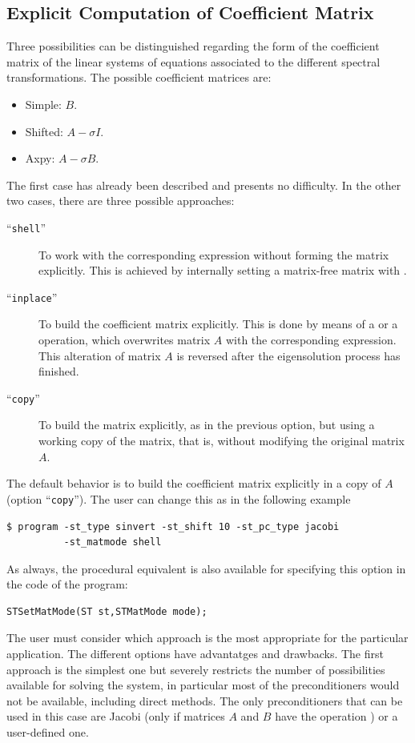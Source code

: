 \subsection{Explicit Computation of Coefficient Matrix}
\label{sec:explicit}

	Three possibilities can be distinguished regarding the form of the coefficient matrix of the linear systems of equations associated to the different spectral transformations. The possible coefficient matrices are:
	\begin{itemize}
	\item Simple: $B$.
	\item Shifted: $A-\sigma I$.
	\item Axpy: $A-\sigma B$.
	\end{itemize}
	The first case has already been described and presents no difficulty. In the other two cases, there are three possible approaches:
	\begin{description}
	\item[``\Verb!shell!''] To work with the corresponding expression without forming the matrix explicitly. This is achieved by internally setting a matrix-free matrix with .
	\item[``\Verb!inplace!''] To build the coefficient matrix explicitly. This is done by means of a  or a  operation, which overwrites matrix $A$ with the corresponding expression. This alteration of matrix $A$ is reversed after the eigensolution process has finished.
	\item[``\Verb!copy!''] To build the matrix explicitly, as in the previous option, but using a working copy of the matrix, that is, without modifying the original matrix $A$. 
	\end{description}
	The default behavior is to build the coefficient matrix explicitly in a copy of $A$ (option ``\Verb!copy!''). The user can change this as in the following example
\begin{Verbatim}[fontsize=\small]
	$ program -st_type sinvert -st_shift 10 -st_pc_type jacobi
		  -st_matmode shell
\end{Verbatim}
	As always, the procedural equivalent is also available for specifying this option in the code of the program:
	\begin{Verbatim}[fontsize=\small]
	STSetMatMode(ST st,STMatMode mode);
	\end{Verbatim}

	The user must consider which approach is the most appropriate for the particular application. The different options have advantatges and drawbacks. The first approach is the simplest one but severely restricts the number of possibilities available for solving the system, in particular most of the \petsc{} preconditioners would not be available, including direct methods. The only preconditioners that can be used in this case are Jacobi (only if matrices $A$ and $B$ have the operation ) or a user-defined one.
	

